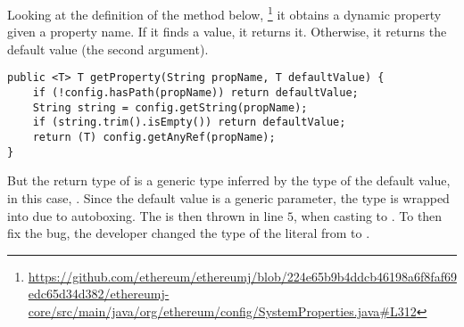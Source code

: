 Looking at the definition of the  method below,%
\footnote{\url{https://github.com/ethereum/ethereumj/blob/224e65b9b4ddcb46198a6f8faf69edc65d34d382/ethereumj-core/src/main/java/org/ethereum/config/SystemProperties.java\#L312}}
it obtains a dynamic property given a property name.
If it finds a value, it returns it.
Otherwise, it returns the default value (the second argument).

\begin{lstlisting}[style=java]
public <T> T getProperty(String propName, T defaultValue) {
    if (!config.hasPath(propName)) return defaultValue;
    String string = config.getString(propName);
    if (string.trim().isEmpty()) return defaultValue;
    return (T) config.getAnyRef(propName);
}
\end{lstlisting}

But the return type of  is a generic type inferred
by the type of the default value, in this case, .
Since the default value is a generic parameter, the type  is wrapped into  due to autoboxing.
The  is then thrown in line $5$,
when casting  to .
To then fix the bug, the developer changed the type of the literal
from  to .


%
%
%
%
